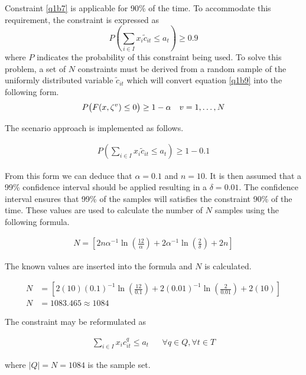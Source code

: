 \documentclass[a4paper,11pt]{article}
\begin{document}
Constraint \ref{q1b7} is applicable for 90\% of the time. To accommodate this requirement, the constraint is expressed as
\begin{equation}
	P(\sum_{i\in I} x_i\tilde{c}_{it} \leq a_t)\geq 0.9
	\label{q1b9}
\end{equation}
where $P$ indicates the probability of this constraint being used. To solve this problem, a set of $N$ constraints must be derived from a random sample of the uniformly distributed variable $\tilde{c}_{it}$ which will convert equation \ref{q1b9} into the following form.
\begin{align}
	P\big{(}F(x,\zeta^v)\leq 0 \big{)} \geq 1 - \alpha && v=1,\dots,N
\end{align}

The scenario approach is implemented as follows.

\begin{align}
	P(\sum_{i\in I} x_i\tilde{c}_{it} \leq a_t)\geq  1-0.1
	\label{q1b11}
\end{align}

From this form we can deduce that $\alpha = 0.1$ and $n= 10$. It is then assumed that a 99\% confidence interval should be applied resulting in a $\delta = 0.01$. The confidence interval ensures that 99\% of the samples will satisfies the constraint 90\% of the time. These values are used to calculate the number of $N$ samples  using the following formula.

\begin{align}
	N=[ 2n\alpha^{-1}\ln(\frac{12}{\alpha}) + 2\alpha^{-1}\ln(\frac{2}{\delta})+2n]
	\label{q1eqN}
\end{align}

The known values are inserted into the formula and $N$ is calculated.

\begin{align}
	N&=[ 2(10)(0.1)^{-1}\ln(\frac{12}{0.1}) + 2(0.01)^{-1}\ln(\frac{2}{0.01})+2(10)]\\
	N& = 1083.465 \approx 1084
\end{align}

The constraint may be reformulated as 

\begin{align}
	\sum_{i\in I} x_ic^{q}_{it} \leq a_t && \forall q\in Q, \forall t \in T
\end{align}

where $|Q| = N = 1084$ is the sample set.

\newpage
\end{document}
